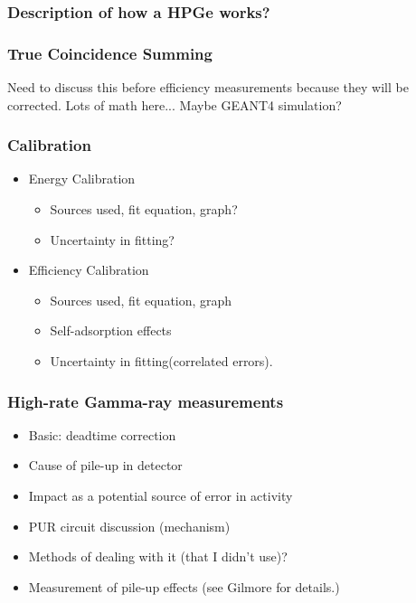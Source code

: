 \documentclass[final,3p,times,twocolumn,authoryear]{elsarticle_modified}
\begin{document}
\subsubsection{Description of how a HPGe works?} %
\subsubsection{True Coincidence Summing}
Need to discuss this before efficiency measurements because they will be corrected. Lots of math here... Maybe GEANT4 simulation?
\subsubsection{Calibration}
	\begin{itemize}
	\itemsep-0.2em 
	  \item Energy Calibration
	  	\begin{itemize}[topsep=-0pt]
		\itemsep-0.2em 
	  	\item Sources used, fit equation, graph?
	  	\item Uncertainty in fitting?
		\end{itemize}
	  \item Efficiency Calibration
	  	\begin{itemize}[topsep=-0pt]
		\itemsep-0.2em 
	  	\item Sources used, fit equation, graph
	  	\item Self-adsorption effects
	  	\item Uncertainty in fitting(correlated errors).
		\end{itemize}
	\end{itemize}

\subsubsection{High-rate Gamma-ray measurements}
	\begin{itemize}
	\itemsep-0.2em 
		\item Basic: deadtime correction
		\item Cause of pile-up in detector
		\item Impact as a potential source of error in activity
		\item PUR circuit discussion (mechanism)
		\item Methods of dealing with it (that I didn't use)?
		\item Measurement of pile-up effects (see Gilmore for details.)
	\end{itemize}
\end{document}
